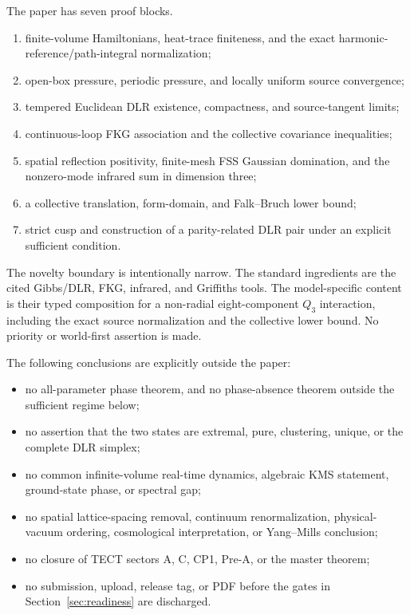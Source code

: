 \documentclass[11pt]{article}
\numberwithin{equation}{section}
\theoremstyle{definition}
\begin{document}
The paper has seven proof blocks.
\begin{enumerate}[label=\textup{(B\arabic*)},leftmargin=2.3em]
\item finite-volume Hamiltonians, heat-trace finiteness, and the exact
      harmonic-reference/path-integral normalization;
\item open-box pressure, periodic pressure, and locally uniform source
      convergence;
\item tempered Euclidean DLR existence, compactness, and source-tangent
      limits;
\item continuous-loop FKG association and the collective covariance
      inequalities;
\item spatial reflection positivity, finite-mesh FSS Gaussian domination,
      and the nonzero-mode infrared sum in dimension three;
\item a collective translation, form-domain, and Falk--Bruch lower bound;
\item strict cusp and construction of a parity-related DLR pair under an
      explicit sufficient condition.
\end{enumerate}

The novelty boundary is intentionally narrow.  The standard ingredients are
the cited Gibbs/DLR, FKG, infrared, and Griffiths tools.  The model-specific
content is their typed composition for a non-radial eight-component $Q_3$
interaction, including the exact source normalization and the collective
lower bound.  No priority or world-first assertion is made.

The following conclusions are explicitly outside the paper:
\begin{itemize}[leftmargin=2.3em]
\item no all-parameter phase theorem, and no phase-absence theorem outside
      the sufficient regime below;
\item no assertion that the two states are extremal, pure, clustering,
      unique, or the complete DLR simplex;
\item no common infinite-volume real-time dynamics, algebraic KMS statement,
      ground-state phase, or spectral gap;
\item no spatial lattice-spacing removal, continuum renormalization, physical-vacuum
      ordering, cosmological interpretation, or Yang--Mills conclusion;
\item no closure of TECT sectors A, C, CP1, Pre-A, or the master theorem;
\item no submission, upload, release tag, or PDF before the gates in
      Section~\ref{sec:readiness} are discharged.
\end{itemize}
\end{document}
